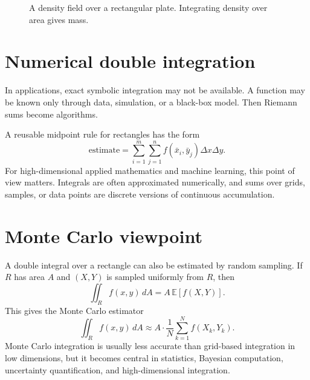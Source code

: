 \documentclass[11pt]{article}
\newcommand{\dA}{\,dA}
\newcommand{\E}{\mathbb E}
\begin{document}
\begin{figure}[H]
\centering
{}
\caption{A density field over a rectangular plate. Integrating density over area gives mass.}
\end{figure}

\section{Numerical double integration}

In applications, exact symbolic integration may not be available. A function may be known only through data, simulation, or a black-box model. Then Riemann sums become algorithms.

A reusable midpoint rule for rectangles has the form
\[
\text{estimate}=\sum_{i=1}^m\sum_{j=1}^n f(\bar x_i,\bar y_j)\Delta x\Delta y.
\]
For high-dimensional applied mathematics and machine learning, this point of view matters. Integrals are often approximated numerically, and sums over grids, samples, or data points are discrete versions of continuous accumulation.

\section{Monte Carlo viewpoint}

A double integral over a rectangle can also be estimated by random sampling. If $R$ has area $A$ and $(X,Y)$ is sampled uniformly from $R$, then
\[
\iint_R f(x,y)\dA=A\,\E[f(X,Y)].
\]
This gives the Monte Carlo estimator
\[
\iint_R f(x,y)\dA\approx A\cdot\frac1N\sum_{k=1}^N f(X_k,Y_k).
\]
Monte Carlo integration is usually less accurate than grid-based integration in low dimensions, but it becomes central in statistics, Bayesian computation, uncertainty quantification, and high-dimensional integration.
\end{document}
